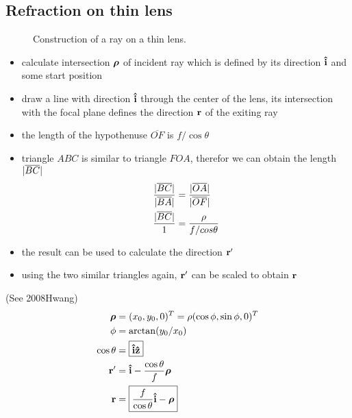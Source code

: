 \documentclass[twocolumn,DIV19]{scrartcl}
\begin{document}
\subsection{Refraction on thin lens}
\begin{figure}[!hbt]
  \centering
  
  \caption{Construction of a ray on a thin lens.}
\end{figure}
\begin{itemize}
\item calculate intersection $\boldsymbol\rho$ of incident ray which is defined
  by its direction $\mathbf{\hat{i}}$ and some start position
\item draw a line with direction $\mathbf{\hat{i}}$ through the center of the lens,
  its intersection with the focal plane defines the direction $\mathbf{r}$ of
  the exiting ray
\item the length of the hypothenuse $\overline{OF}$ is $f/\cos\theta$
\item triangle $ABC$ is similar to triangle $FOA$, therefor we can
  obtain the length $\mathopen| \overline{BC} \mathclose|$ 
  \begin{align}
    \frac{\mathopen| \overline{BC} \mathclose|}{\mathopen| \overline{BA} \mathclose|}&=
    \frac{\mathopen| \overline{OA} \mathclose|}{\mathopen| \overline{OF} \mathclose|}\\
    \frac{\mathopen| \overline{BC} \mathclose|}{1}&=
    \frac{\rho}{f/cos\theta}
  \end{align}
\item the result can be used to calculate the direction $\mathbf{r}'$
\item using the two similar triangles again, $\mathbf{r}'$ can be scaled to
  obtain $\mathbf{r}$
\end{itemize}
(See 2008Hwang)
\begin{align}
  \boldsymbol\rho&=(x_0,y_0,0)^T=\rho (\cos\phi,\sin\phi,0)^T\\
  \phi&=\arctan(y_0/x_0)\\
  \cos\theta&=\boxed{\mathbf{\hat{i}}\mathbf{\hat{z}}}\\
  \mathbf{r}'&=\mathbf{\hat{i}}- \frac{\cos\theta}{f}\boldsymbol\rho\\
   \mathbf{r}&=\boxed{\frac{f}{\cos\theta} \mathbf{\hat{i}} -\boldsymbol\rho}
\end{align}
\end{document}
